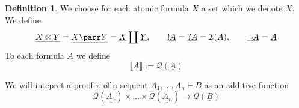 \documentclass[12pt]{article}
\theoremstyle{plain}
\theoremstyle{definition}
\newtheorem{defn}[thm]{Definition} %
\newcommand{\call}[1]{\mathcal{#1}}
\newcommand{\Ical}{\call{I}}
\newcommand{\Qcal}{\call{Q}}
\newcommand{\lto}{\longrightarrow}
\begin{document}
	\begin{defn}
		We choose for each atomic formula $X$ a set which we denote $\underline{X}$. We define
		\begin{equation}
			\underline{X \otimes Y} = \underline{X \parr Y} = \underline{X} \coprod \underline{Y},\qquad \underline{! A} = \underline{? A} = \Ical(A),\qquad \underline{\neg A} = \underline{A}
			\end{equation}
		To each formula $A$ we define
		\begin{equation}
			\llbracket A \rrbracket := \Qcal(\underline{A})
			\end{equation}
		\end{defn}
	
	We will intepret a proof $\pi$ of a sequent $A_1, \ldots, A_n \vdash B$ as an additive function
	\begin{equation}
		\Qcal(\underline{A_1}) \times \ldots \times \Qcal(\underline{A_n}) \lto \Qcal(\underline{B})
		\end{equation}
	
\end{document}
